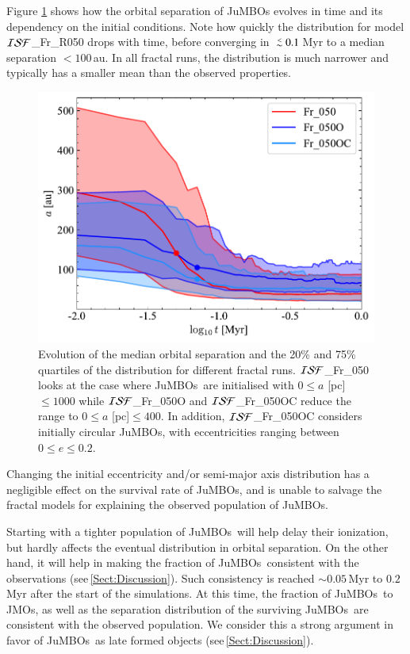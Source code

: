 \documentclass[submission,phys]{lib/SciPost}
\def\aplt{\ {\raise-.5ex\hbox{$\buildrel<\over\sim$}}\ }
\newcommand{\jumbos}{\mbox{JuMBOs}}
\begin{document}
Figure \ref{Fig:sma_vs_time_model_ISF_Fr} shows how the orbital separation 
of JuMBOs evolves in time and its dependency on the initial conditions. 
Note how quickly the distribution for model ${\cal
  ISF}$\_Fr\_R050 drops with time, before converging in $\aplt
0.1$\,Myr to a median separation $<100$\,au.  In all fractal runs, the
distribution is much narrower and typically has a smaller mean than the 
observed properties.

\begin{figure}
  \centering
        \includegraphics[width=0.75\columnwidth]{figures/Fractal_GenObs_sem_evol.pdf}
        \caption{Evolution of the median orbital separation and the
          20\% and 75\% quartiles of the distribution for different
          fractal runs.  ${\cal ISF}$\_Fr\_050 looks at the case where \jumbos\ are
          initialised with $0\leq a$ [pc]$\leq 1000$ while ${\cal ISF}$\_Fr\_050O
          and ${\cal ISF}$\_Fr\_050OC reduce the range to $0\leq a$ [pc]$\leq
          400$. In addition, ${\cal ISF}$\_Fr\_050OC considers initially circular
          JuMBOs, with eccentricities ranging between $0\leq e\leq
          0.2$.}
        \label{Fig:sma_vs_time_model_ISF_Fr}
\end{figure}

Changing the initial eccentricity and/or semi-major axis distribution has a 
negligible effect on the survival rate of JuMBOs, and is unable to salvage 
the fractal models for explaining the observed population of \jumbos.  

Starting with a tighter population of \jumbos\, will help delay their
ionization, but hardly affects the eventual distribution in orbital
separation.  On the other hand, it will help in making the fraction of
\jumbos\, consistent with the observations
(see\,\ref{Sect:Discussion}). Such consistency is reached $\sim
0.05$\,Myr to $0.2$\,Myr after the start of the simulations.  At this
time, the fraction of \jumbos\, to JMOs, as well as the separation
distribution of the surviving \jumbos\, are consistent with the
observed population. We consider this a strong argument in favor of
\jumbos\, as late formed objects (see\,\ref{Sect:Discussion}).
\end{document}
